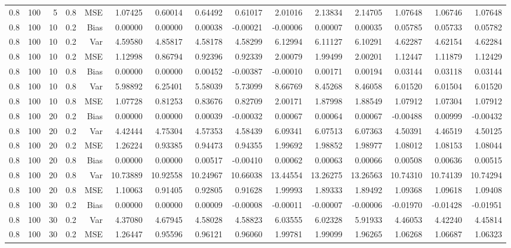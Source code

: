 \begin{table}[!htbp]
\begin{tabular}{lrrrrrrrrrrrrrr}
0.8 & 100 &  5 & 0.8 & MSE & 1.07425 & 0.60014 & 0.64492 & 0.61017 & 2.01016 & 2.13834 & 2.14705 & 1.07648 & 1.06746 & 1.07648 \\
0.8 & 100 & 10 & 0.2 & Bias & 0.00000 & 0.00000 & 0.00038 & -0.00021 & -0.00006 & 0.00007 & 0.00035 & 0.05785 & 0.05733 & 0.05782 \\
0.8 & 100 & 10 & 0.2 & Var & 4.59580 & 4.85817 & 4.58178 & 4.58299 & 6.12994 & 6.11127 & 6.10291 & 4.62287 & 4.62154 & 4.62284 \\
0.8 & 100 & 10 & 0.2 & MSE & 1.12998 & 0.86794 & 0.92396 & 0.92339 & 2.00079 & 1.99499 & 2.00201 & 1.12447 & 1.11879 & 1.12429 \\
0.8 & 100 & 10 & 0.8 & Bias & 0.00000 & 0.00000 & 0.00452 & -0.00387 & -0.00010 & 0.00171 & 0.00194 & 0.03144 & 0.03118 & 0.03144 \\
0.8 & 100 & 10 & 0.8 & Var & 5.98892 & 6.25401 & 5.58039 & 5.73099 & 8.66769 & 8.45268 & 8.46058 & 6.01520 & 6.01504 & 6.01520 \\
0.8 & 100 & 10 & 0.8 & MSE & 1.07728 & 0.81253 & 0.83676 & 0.82709 & 2.00171 & 1.87998 & 1.88549 & 1.07912 & 1.07304 & 1.07912 \\
0.8 & 100 & 20 & 0.2 & Bias & 0.00000 & 0.00000 & 0.00039 & -0.00032 & 0.00067 & 0.00064 & 0.00067 & -0.00488 & 0.00999 & -0.00432 \\
0.8 & 100 & 20 & 0.2 & Var & 4.42444 & 4.75304 & 4.57353 & 4.58439 & 6.09341 & 6.07513 & 6.07363 & 4.50391 & 4.46519 & 4.50125 \\
0.8 & 100 & 20 & 0.2 & MSE & 1.26224 & 0.93385 & 0.94473 & 0.94355 & 1.99692 & 1.98852 & 1.98977 & 1.08012 & 1.08153 & 1.08044 \\
0.8 & 100 & 20 & 0.8 & Bias & 0.00000 & 0.00000 & 0.00517 & -0.00410 & 0.00062 & 0.00063 & 0.00066 & 0.00508 & 0.00636 & 0.00515 \\
0.8 & 100 & 20 & 0.8 & Var & 10.73889 & 10.92558 & 10.24967 & 10.66038 & 13.44554 & 13.26275 & 13.26563 & 10.74310 & 10.74139 & 10.74294 \\
0.8 & 100 & 20 & 0.8 & MSE & 1.10063 & 0.91405 & 0.92805 & 0.91628 & 1.99993 & 1.89333 & 1.89492 & 1.09368 & 1.09618 & 1.09408 \\
0.8 & 100 & 30 & 0.2 & Bias & 0.00000 & 0.00000 & 0.00009 & -0.00008 & -0.00011 & -0.00007 & -0.00006 & -0.01970 & -0.01428 & -0.01951 \\
0.8 & 100 & 30 & 0.2 & Var & 4.37080 & 4.67945 & 4.58028 & 4.58823 & 6.03555 & 6.02328 & 5.91933 & 4.46053 & 4.42240 & 4.45814 \\
0.8 & 100 & 30 & 0.2 & MSE & 1.26447 & 0.95596 & 0.96121 & 0.96060 & 1.99781 & 1.99099 & 1.96265 & 1.06268 & 1.06687 & 1.06323 \\

\end{tabular}
\end{table}
